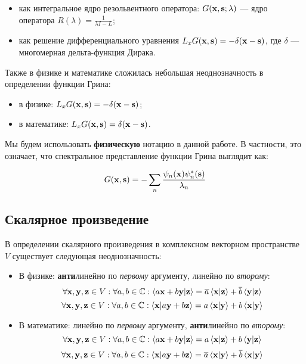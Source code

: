 \begin{itemize}
\item как интегральное ядро резольвентного оператора: $G(\vb{x}, \vb{s}; \lambda)$ — ядро оператора $R(\lambda) = \frac{1}{\lambda I - L}$;
\item как решение дифференциального уравнения $L_x G(\vb{x}, \vb{s}) = -\delta(\vb{x} - \vb{s})$, где $\delta$ — многомерная дельта-функция Дирака.
\end{itemize}

Также в физике и математике сложилась небольшая неоднозначность в определении функции Грина:

\begin{itemize}
\item в физике: $L_x G(\vb{x}, \vb{s}) = -\delta(\vb{x} - \vb{s})$;
\item в математике: $L_x G(\vb{x}, \vb{s}) = \delta(\vb{x} - \vb{s})$.
\end{itemize} 

Мы будем использовать \textbf{физическую} нотацию в данной работе. В частности, это означает, что спектральное представление функции Грина выглядит как: 

\[
G(\vb{x}, \vb{s}) = -\sum\limits_n \frac{\psi_n(\vb{x}) \psi_n^*(\vb{s})}{\lambda_n}
\]

\subsection{Скалярное произведение}
В определении скалярного произведения в комплексном векторном пространстве $V$ существует следующая неоднозначность:

\begin{itemize}
\item В физике: \textbf{анти}линейно по \textit{первому} аргументу, линейно по \textit{второму}:
\[
\forall \vb{x}, \vb{y}, \vb{z} \in V: \forall a, b \in \bbC: \ip{a\vb{x} + b\vb{y}}{\vb{z}} = \cconj{a} \ip{\vb{x}}{\vb{z}} + \cconj{b} \ip{\vb{y}}{\vb{z}}
\]
\[
\forall \vb{x}, \vb{y}, \vb{z} \in V: \forall a, b \in \bbC: \ip{\vb{x}}{a\vb{y} + b\vb{z}} = a \ip{\vb{x}}{\vb{y}} + b \ip{\vb{x}}{\vb{y}}
\]
\item В математике: линейно по \textit{первому} аргументу, \textbf{анти}линейно по \textit{второму}:
\[
\forall \vb{x}, \vb{y}, \vb{z} \in V: \forall a, b \in \bbC: \ip{a\vb{x} + b\vb{y}}{\vb{z}} = a \ip{\vb{x}}{\vb{z}} + b \ip{\vb{y}}{\vb{z}}
\]
\[
\forall \vb{x}, \vb{y}, \vb{z} \in V: \forall a, b \in \bbC: \ip{\vb{x}}{a\vb{y} + b\vb{z}} = \cconj{a} \ip{\vb{x}}{\vb{y}} + \cconj{b} \ip{\vb{x}}{\vb{y}}
\]
\end{itemize}


